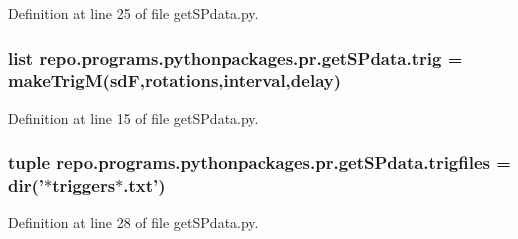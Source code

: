 Definition at line 25 of file get\-S\-Pdata.\-py.

\hypertarget{namespacerepo_1_1programs_1_1pythonpackages_1_1pr_1_1getSPdata_af3d30f9077a6d1c700f7f691a8288334}{
\subsubsection[{trig}]{\setlength{\rightskip}{0pt plus 5cm}list repo.\-programs.\-pythonpackages.\-pr.\-get\-S\-Pdata.\-trig = make\-Trig\-M(sd\-F,{\bf rotations},interval,delay)}}\label{namespacerepo_1_1programs_1_1pythonpackages_1_1pr_1_1getSPdata_af3d30f9077a6d1c700f7f691a8288334}


Definition at line 15 of file get\-S\-Pdata.\-py.

\hypertarget{namespacerepo_1_1programs_1_1pythonpackages_1_1pr_1_1getSPdata_aa7e1cd1161dfd5e09ecfea09630c0395}{
\subsubsection[{trigfiles}]{\setlength{\rightskip}{0pt plus 5cm}tuple repo.\-programs.\-pythonpackages.\-pr.\-get\-S\-Pdata.\-trigfiles = dir('$\ast$triggers$\ast$.txt')}}\label{namespacerepo_1_1programs_1_1pythonpackages_1_1pr_1_1getSPdata_aa7e1cd1161dfd5e09ecfea09630c0395}


Definition at line 28 of file get\-S\-Pdata.\-py.


